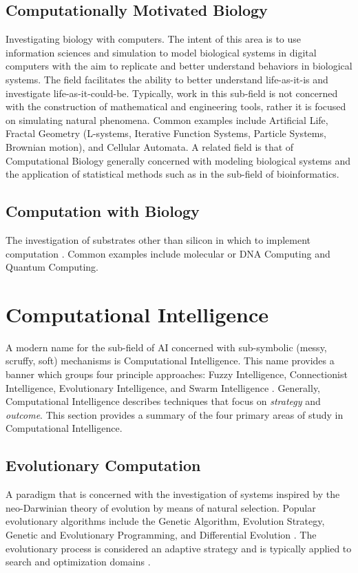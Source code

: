 \documentclass[a4paper, 11pt]{article}
\begin{document}
\subsection{Computationally Motivated Biology}
Investigating biology with computers. The intent of this area is to use information sciences and simulation to model biological systems in digital computers with the aim to replicate and better understand behaviors in biological systems. The field facilitates the ability to better understand life-as-it-is and investigate life-as-it-could-be. Typically, work in this sub-field is not concerned with the construction of mathematical and engineering tools, rather it is focused on simulating natural phenomena. Common examples include Artificial Life, Fractal Geometry (L-systems, Iterative Function Systems, Particle Systems, Brownian motion), and Cellular Automata. A related field is that of Computational Biology generally concerned with modeling biological systems and the application of statistical methods such as in the sub-field of bioinformatics.

\subsection{Computation with Biology}
The investigation of substrates other than silicon in which to implement computation \cite{Aaronson2005}. Common examples include molecular or DNA Computing and Quantum Computing.

% 
% 
\section{Computational Intelligence}
\label{sec:computationl_intelligence}
A modern name for the sub-field of AI concerned with sub-symbolic (messy, scruffy, soft) mechanisms is Computational Intelligence. This name provides a banner which groups four principle approaches: Fuzzy Intelligence, Connectionist Intelligence, Evolutionary Intelligence, and Swarm Intelligence \cite{Engelbrecht2007, Pedrycz1997}. Generally, Computational Intelligence describes techniques that focus on \emph{strategy} and \emph{outcome}. This section provides a summary of the four primary areas of study in Computational Intelligence.

\subsection{Evolutionary Computation} 
A paradigm that is concerned with the investigation of systems inspired by the neo-Darwinian theory of evolution by means of natural selection. Popular evolutionary algorithms include the Genetic Algorithm, Evolution Strategy, Genetic and Evolutionary Programming, and Differential Evolution \cite{Baeck2000, Baeck2000a}. The evolutionary process is considered an adaptive strategy and is typically applied to search and optimization domains \cite{Goldberg1989, Holland1975}.
\end{document}
